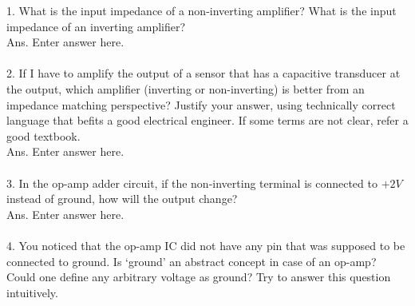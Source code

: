 \documentclass[12pt]{article}
\begin{document}
1. What is the input impedance of a non-inverting amplifier? What is the input impedance of an inverting amplifier?\\
Ans. Enter answer here.
\\\\
2. If I have to amplify the output of a sensor that has a capacitive transducer at the output, which amplifier (inverting or non-inverting) is better from an impedance matching perspective? Justify your answer, using technically correct language that befits a good electrical engineer. If some terms are not clear, refer a good textbook.\\
Ans. Enter answer here.
\\\\
3. In the op-amp adder circuit, if the non-inverting terminal is connected to $+2V$ instead of ground, how will the output change?\\
Ans. Enter answer here.
\\\\
4. You noticed that the op-amp IC did not have any pin that was supposed to be connected to ground. Is `ground' an abstract concept in case of an op-amp? Could one define any arbitrary voltage as ground? Try to answer this question intuitively.
\end{document}
